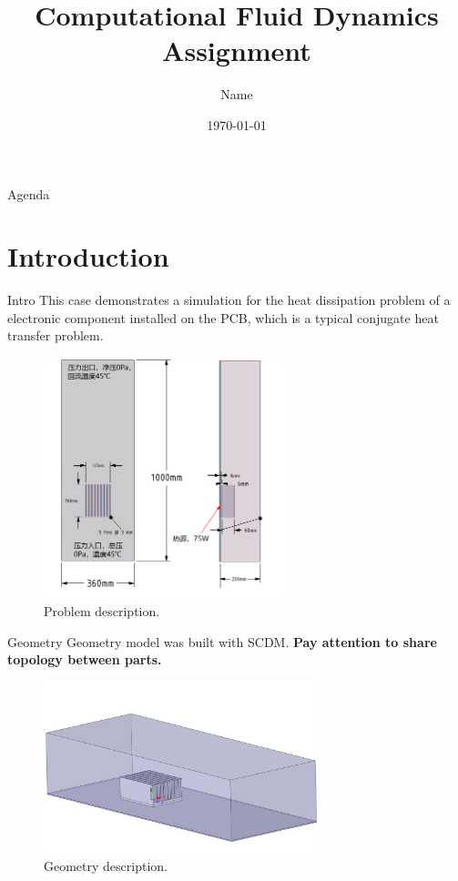 \documentclass[10pt, xcolor=table]{beamer}
\title[CFD assignment] {Computational Fluid Dynamics Assignment}
\author[Name]{Name}
\institute[Master Student] {School of Mechanical Engineering
}
\date{\today}
\begin{document}
%
\begin{frame}[plain]
	\titlepage
\end{frame}
%
\begin{frame}{Agenda}
	\tableofcontents
\end{frame}
%
%
\section{Introduction}
\begin{frame}{Intro}
	This case demonstrates a simulation for the heat dissipation  problem of a electronic component  installed on the PCB, which is a typical conjugate heat transfer problem.
	\\
	\vfill

	\begin{figure}
		\includegraphics[height=7cm]{figure2.png}
		\caption{Problem description.}
	\end{figure}

	\vfill
\end{frame}
%
\begin{frame}{Geometry}
	Geometry model was built with SCDM. \textbf{Pay attention to share topology between parts.}
	\vfill
	\begin{figure}
		\includegraphics[width=8cm]{figure1.jpg}
		\caption{Geometry description.}
	\end{figure}	
\end{frame}
\end{document}
